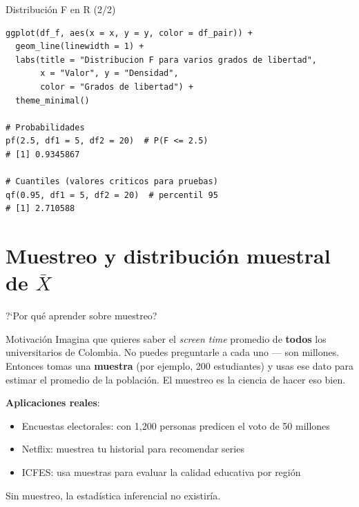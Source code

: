 \documentclass[aspectratio=169, 11pt]{beamer}
\begin{document}
\begin{frame}[fragile]{Distribución F en R (2/2)}
\begin{lstlisting}
ggplot(df_f, aes(x = x, y = y, color = df_pair)) +
  geom_line(linewidth = 1) +
  labs(title = "Distribucion F para varios grados de libertad",
       x = "Valor", y = "Densidad",
       color = "Grados de libertad") +
  theme_minimal()

# Probabilidades
pf(2.5, df1 = 5, df2 = 20)  # P(F <= 2.5)
# [1] 0.9345867

# Cuantiles (valores criticos para pruebas)
qf(0.95, df1 = 5, df2 = 20)  # percentil 95
# [1] 2.710588
\end{lstlisting}
\end{frame}

\section{Muestreo y distribución muestral de $\bar{X}$}

\begin{frame}{?`Por qu\'e aprender sobre muestreo?}
\begin{exampleblock}{Motivaci\'on}
Imagina que quieres saber el \emph{screen time} promedio de \textbf{todos} los universitarios de Colombia. No puedes preguntarle a cada uno --- son millones. Entonces tomas una \textbf{muestra} (por ejemplo, 200 estudiantes) y usas ese dato para estimar el promedio de la poblaci\'on. El muestreo es la ciencia de hacer eso bien.
\end{exampleblock}

\textbf{Aplicaciones reales}:
\begin{itemize}\setlength{\itemsep}{1pt}
  \item Encuestas electorales: con 1{,}200 personas predicen el voto de 50 millones
  \item Netflix: muestrea tu historial para recomendar series
  \item ICFES: usa muestras para evaluar la calidad educativa por regi\'on
\end{itemize}

\alert{Sin muestreo, la estad\'istica inferencial no existir\'ia.}
\end{frame}
\end{document}
